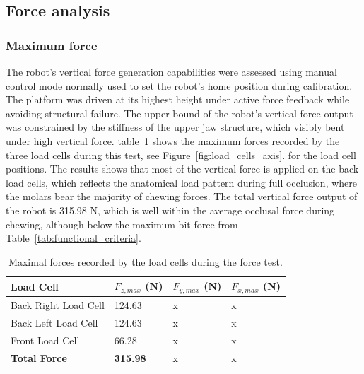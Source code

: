\subsection{Force analysis}

\subsubsection{Maximum force}

The robot's vertical force generation capabilities were assessed using manual control mode normally used to set the robot's home position during calibration. 
The platform was driven at its highest height under active force feedback while avoiding structural failure. The upper bound of the robot's vertical force 
output was constrained by the stiffness of the upper jaw structure, which visibly bent under high vertical force. table~\ref{tab:max_force} shows the 
maximum forces recorded by the three load cells during this test, see Figure~\ref{fig:load_cells_axis}.
for the load cell positions. The results shows that most of the vertical force is applied on the back load cells, which reflects the 
anatomical load pattern during full occlusion, where the molars bear the majority of chewing forces. The total vertical force output of the robot is 
315.98 N, which is well within the average occlusal force during chewing, although below the maximum bit force from Table~\ref{tab:functional_criteria}.
\begin{table}[H]
    \centering
    \begin{tabular}{p{4cm} p{2cm} p{2cm} p{2cm}}
        \toprule
        \textbf{Load Cell} & \textbf{$F_{z,max}$ (N)} & \textbf{$F_{y,max}$ (N)} & \textbf{$F_{x,max}$ (N)} \\
        \midrule
        Back Right Load Cell & 124.63 & x & x \\
        Back Left Load Cell & 124.63 & x & x  \\
        Front Load Cell & 66.28 & x & x  \\
        \midrule
        \textbf{Total Force} & \textbf{315.98} & x & x \\
        \bottomrule       
    \end{tabular}
    \caption{Maximal forces recorded by the load cells during the force test.}
    \label{tab:max_force}
\end{table}


